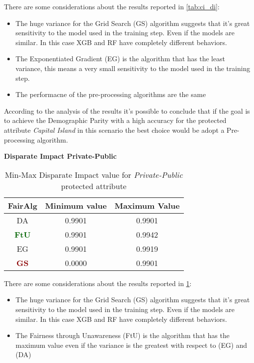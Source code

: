 There are some considerations about the results reported in \cref{tab:ci_di}:

\begin{itemize}

    \item The huge variance for the Grid Search (GS) algorithm suggests that it's great sensitivity to the model used in the training step. Even if the models are similar. In this case XGB and RF have completely different behaviors.

    \item The Exponentiated Gradient (EG) is the algorithm that has the least variance, this means a very small sensitivity to the model used in the training step.

    \item The performacne of the pre-processing algorithms are the same

\end{itemize}

According to the analysis of the results it's possible to conclude that if the goal is to achieve the Demographic Parity with a high accuracy for the protected attribute \emph{Capital Island} in this scenario the best choice would be adopt a Pre-processing algorithm.

\textbf{Disparate Impact Private-Public}
\begin{table}
    \centering
    \begin{tabular}{|c|c|c|}
        \hline
        \textbf{FairAlg} & \textbf{Minimum value} & \textbf{Maximum Value} \\
        \hline
        DA & 0.9901 & 0.9901 \\
        \hline
        \textcolor{darkgreen}{\textbf{FtU}} & 0.9901 & 0.9942 \\
        \hline
        EG & 0.9901 & 0.9919 \\
        \hline
        \textcolor{darkred}{\textbf{GS}} & 0.0000 & 0.9901 \\
        \hline
    \end{tabular}
    \caption{Min-Max Disparate Impact value for \emph{Private-Public} protected attribute}
    \label{tab:pp_di}
\end{table}

There are some considerations about the results reported in \cref{tab:pp_di}:

\begin{itemize}

    \item The huge variance for the Grid Search (GS) algorithm suggests that it's great sensitivity to the model used in the training step. Even if the models are similar. In this case XGB and RF have completely different behaviors.

    \item The Fairness through Unawareness (FtU) is the algorithm that has the maximum value even if the variance is the greatest with respect to (EG) and (DA)

\end{itemize}


